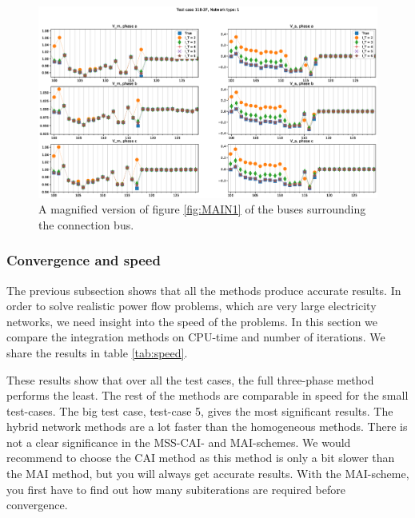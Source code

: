 \documentclass[10pt,journal]{article}
\begin{document}
\begin{figure}[h]
\centering
\includegraphics[width=\textwidth]{Images/Z_MAI_N1.eps}
\caption{A magnified version of figure \ref{fig:MAIN1} of the buses surrounding the connection bus.}\label{fig:ZMAIN1}
\end{figure}

\subsubsection{Convergence and speed} 
The previous subsection shows that all the methods produce accurate results. In order to solve realistic power flow problems, which are very large electricity networks, we need insight into the speed of the problems. In this section we compare the integration methods on CPU-time and number of iterations. We share the results in table \ref{tab:speed}. 

\noindent These results show that over all the test cases, the full three-phase method performs the least. The rest of the methods are comparable in speed for the small test-cases. The big test case, test-case 5, gives the most significant results. The hybrid network methods are a lot faster than the homogeneous methods. \newline \newline
There is not a clear significance in the MSS-CAI- and MAI-schemes. We would recommend to choose the CAI method as this method is only a bit slower than the MAI method, but you will always get accurate results. With the MAI-scheme, you first have to find out how many subiterations are required before convergence.  
\end{document}
